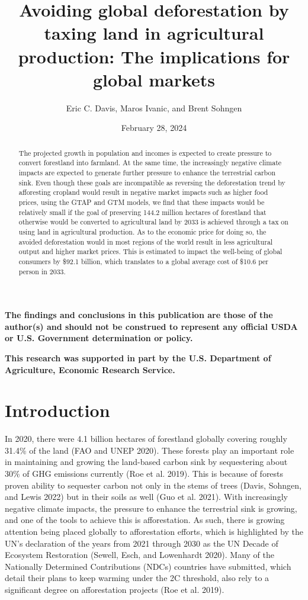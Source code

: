 \documentclass[
]{article}
\title{Avoiding global deforestation by taxing land in agricultural production: The implications for global markets}
\author{Eric C. Davis, Maros Ivanic, and Brent Sohngen}
\date{February 28, 2024}
\begin{document}
\maketitle
\begin{abstract}
The projected growth in population and incomes is expected to create pressure to convert forestland into farmland. At the same time, the increasingly negative climate impacts are expected to generate further pressure to enhance the terrestrial carbon sink. Even though these goals are incompatible as reversing the deforestation trend by afforesting cropland would result in negative market impacts such as higher food prices, using the GTAP and GTM models, we find that these impacts would be relatively small if the goal of preserving 144.2 million hectares of forestland that otherwise would be converted to agricultural land by 2033 is achieved through a tax on using land in agricultural production. As to the economic price for doing so, the avoided deforestation would in most regions of the world result in less agricultural output and higher market prices. This is estimated to impact the well-being of global consumers by \$92.1 billion, which translates to a global average cost of \$10.6 per person in 2033.
\end{abstract}

\vspace{1in}

\textbf{The findings and conclusions in this publication are those of the author(s) and should not be construed to represent any official USDA or U.S. Government determination or policy.}

\textbf{This research was supported in part by the U.S. Department of Agriculture, Economic Research Service.}

\newpage

\hypertarget{introduction}{%
\section{Introduction}\label{introduction}}

In 2020, there were 4.1 billion hectares of forestland globally covering roughly 31.4\% of the land (FAO and UNEP 2020). These forests play an important role in maintaining and growing the land-based carbon sink by sequestering about 30\% of GHG emissions currently (Roe et al. 2019). This is because of forests proven ability to sequester carbon not only in the stems of trees (Davis, Sohngen, and Lewis 2022) but in their soils as well (Guo et al. 2021). With increasingly negative climate impacts, the pressure to enhance the terrestrial sink is growing, and one of the tools to achieve this is afforestation. As such, there is growing attention being placed globally to afforestation efforts, which is highlighted by the UN's declaration of the years from 2021 through 2030 as the UN Decade of Ecosystem Restoration (Sewell, Esch, and Lowenhardt 2020). Many of the Nationally Determined Contributions (NDCs) countries have submitted, which detail their plans to keep warming under the 2C threshold, also rely to a significant degree on afforestation projects (Roe et al. 2019).
\end{document}
